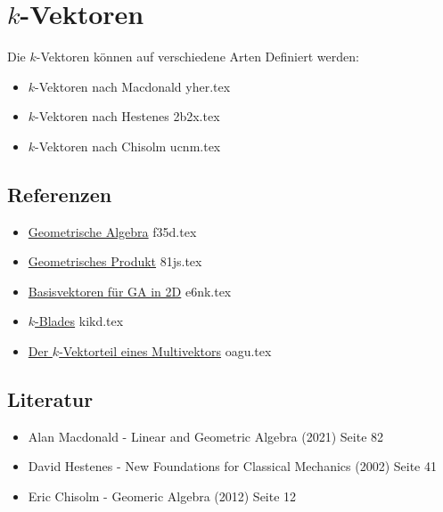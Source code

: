\documentclass{sajzk}
\begin{document}
\section{\texorpdfstring{$k$-Vektoren}{k-Vektoren}}
\label{93t3}
Die $k$-Vektoren können auf verschiedene Arten Definiert werden:

\begin{itemize}
    \item $k$-Vektoren nach Macdonald yher.tex
    \item $k$-Vektoren nach Hestenes 2b2x.tex
    \item $k$-Vektoren nach Chisolm ucnm.tex
\end{itemize}

\subsection{Referenzen}
\begin{itemize}
    \item \href{f35d.pdf}{Geometrische Algebra} f35d.tex
    \item \href{81js.pdf}{Geometrisches Produkt} 81js.tex
    \item \href{e6nk.pdf}{Basisvektoren für GA in 2D} e6nk.tex
    \item \href{kikd.pdf}{$k$-Blades} kikd.tex
    \item \href{oagu.pdf}{Der $k$-Vektorteil eines Multivektors} oagu.tex
\end{itemize}

\subsection{Literatur}
\begin{itemize}
  \item Alan Macdonald - Linear and Geometric Algebra (2021) Seite 82
  \item David Hestenes - New Foundations for Classical Mechanics (2002) Seite 41
  \item Eric Chisolm - Geomeric Algebra (2012) Seite 12
\end{itemize}
\end{document}

